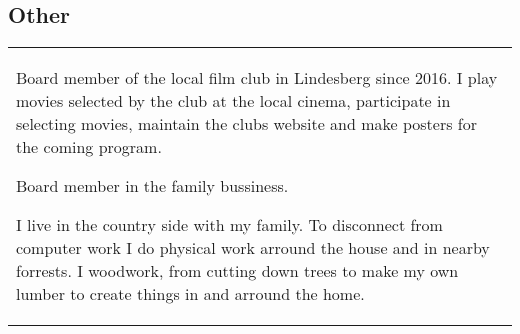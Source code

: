 \documentclass{cv-stylish}
\begin{document}
\begin{center}

\section{Other}

\begin{tabularx}{0.97\linewidth}{X}
Board member of the local film club in Lindesberg since 2016. I play
movies selected by the club at the local cinema, participate in
selecting movies, maintain the clubs website and make posters for the
coming program.

\vspace{10pt}

Board member in the family bussiness.

\vspace{10pt}

I live in the country side with my family. To disconnect from
computer work I do physical work arround the house and in nearby
forrests. I woodwork, from cutting down trees to make my own lumber to
create things in and arround the home.
\end{tabularx}

\end{center}
\end{document}
